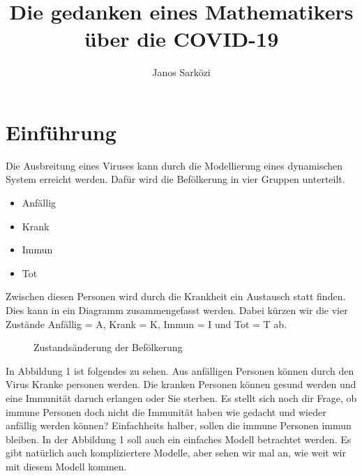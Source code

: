 \documentclass[11pt, a4paper]{article}
\begin{document}
\begin{titlepage}
    \title{Die gedanken eines Mathematikers über die COVID-19}
    \author{Janos Sarközi}
    \maketitle
\end{titlepage}

\section{Einführung}

Die Ausbreitung eines Viruses kann durch die Modellierung eines dynamischen System erreicht
werden. Dafür wird die Befölkerung in vier Gruppen unterteilt.

\begin{itemize}[itemsep=0pt]
    \item Anfällig
    \item Krank
    \item Immun
    \item Tot
\end{itemize}

Zwischen diesen Personen wird durch die Krankheit ein Austausch statt finden. Dies kann
in ein Diagramm zusammengefasst werden. Dabei kürzen wir die vier Zustände Anfällig = A,
Krank = K, Immun = I und Tot = T ab.

\begin{figure}[h]
\centering
{}
\caption{Zustandsänderung der Befölkerung}
\end{figure}

In Abbildung 1 ist folgendes zu sehen. Aus anfälligen Personen können durch den Virus Kranke personen werden. Die kranken Personen können gesund werden und eine Immunität daruch
erlangen oder Sie sterben. Es stellt sich noch dir Frage, ob immune Personen doch nicht die
Immunität haben wie gedacht und wieder anfällig werden können? Einfachheits halber, sollen
die immune Personen immun bleiben. In der Abbildung 1 soll auch ein einfaches Modell
betrachtet werden. Es gibt natürlich auch kompliziertere Modelle, aber sehen wir mal an,
wie weit wir mit diesem Modell kommen.
\end{document}
